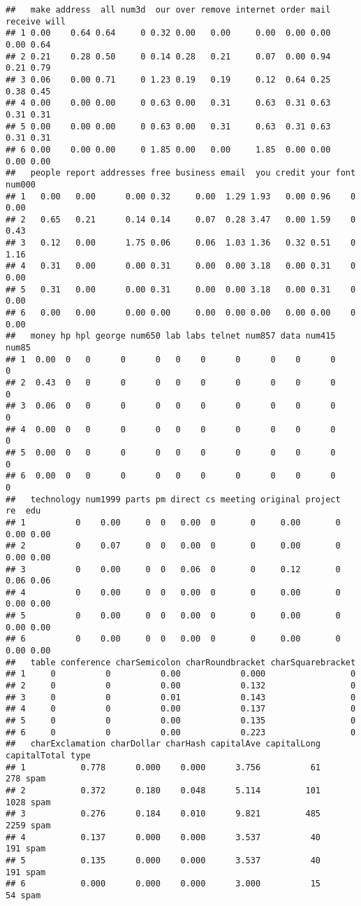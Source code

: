 \documentclass[
]{article}
\begin{document}
\begin{verbatim}
##   make address  all num3d  our over remove internet order mail receive will
## 1 0.00    0.64 0.64     0 0.32 0.00   0.00     0.00  0.00 0.00    0.00 0.64
## 2 0.21    0.28 0.50     0 0.14 0.28   0.21     0.07  0.00 0.94    0.21 0.79
## 3 0.06    0.00 0.71     0 1.23 0.19   0.19     0.12  0.64 0.25    0.38 0.45
## 4 0.00    0.00 0.00     0 0.63 0.00   0.31     0.63  0.31 0.63    0.31 0.31
## 5 0.00    0.00 0.00     0 0.63 0.00   0.31     0.63  0.31 0.63    0.31 0.31
## 6 0.00    0.00 0.00     0 1.85 0.00   0.00     1.85  0.00 0.00    0.00 0.00
##   people report addresses free business email  you credit your font num000
## 1   0.00   0.00      0.00 0.32     0.00  1.29 1.93   0.00 0.96    0   0.00
## 2   0.65   0.21      0.14 0.14     0.07  0.28 3.47   0.00 1.59    0   0.43
## 3   0.12   0.00      1.75 0.06     0.06  1.03 1.36   0.32 0.51    0   1.16
## 4   0.31   0.00      0.00 0.31     0.00  0.00 3.18   0.00 0.31    0   0.00
## 5   0.31   0.00      0.00 0.31     0.00  0.00 3.18   0.00 0.31    0   0.00
## 6   0.00   0.00      0.00 0.00     0.00  0.00 0.00   0.00 0.00    0   0.00
##   money hp hpl george num650 lab labs telnet num857 data num415 num85
## 1  0.00  0   0      0      0   0    0      0      0    0      0     0
## 2  0.43  0   0      0      0   0    0      0      0    0      0     0
## 3  0.06  0   0      0      0   0    0      0      0    0      0     0
## 4  0.00  0   0      0      0   0    0      0      0    0      0     0
## 5  0.00  0   0      0      0   0    0      0      0    0      0     0
## 6  0.00  0   0      0      0   0    0      0      0    0      0     0
##   technology num1999 parts pm direct cs meeting original project   re  edu
## 1          0    0.00     0  0   0.00  0       0     0.00       0 0.00 0.00
## 2          0    0.07     0  0   0.00  0       0     0.00       0 0.00 0.00
## 3          0    0.00     0  0   0.06  0       0     0.12       0 0.06 0.06
## 4          0    0.00     0  0   0.00  0       0     0.00       0 0.00 0.00
## 5          0    0.00     0  0   0.00  0       0     0.00       0 0.00 0.00
## 6          0    0.00     0  0   0.00  0       0     0.00       0 0.00 0.00
##   table conference charSemicolon charRoundbracket charSquarebracket
## 1     0          0          0.00            0.000                 0
## 2     0          0          0.00            0.132                 0
## 3     0          0          0.01            0.143                 0
## 4     0          0          0.00            0.137                 0
## 5     0          0          0.00            0.135                 0
## 6     0          0          0.00            0.223                 0
##   charExclamation charDollar charHash capitalAve capitalLong capitalTotal type
## 1           0.778      0.000    0.000      3.756          61          278 spam
## 2           0.372      0.180    0.048      5.114         101         1028 spam
## 3           0.276      0.184    0.010      9.821         485         2259 spam
## 4           0.137      0.000    0.000      3.537          40          191 spam
## 5           0.135      0.000    0.000      3.537          40          191 spam
## 6           0.000      0.000    0.000      3.000          15           54 spam
\end{verbatim}
\end{document}
